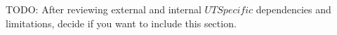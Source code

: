 \label{ch: nonfunctional}

TODO: After reviewing external and internal \(UT Specific\) dependencies and limitations, decide if you want to include this section.